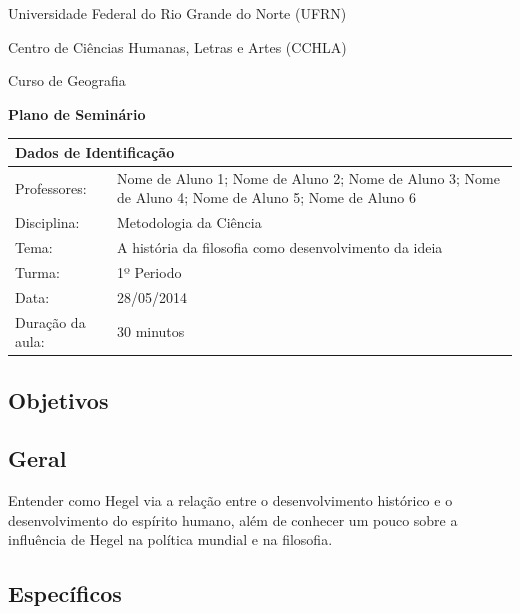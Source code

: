 \documentclass[oneside,a4paper,12pt]{article}
\newcommand{\universidade}{Universidade Federal do Rio Grande do Norte (UFRN) \par Centro de Ciências Humanas, Letras e Artes (CCHLA)}
\newcommand{\curso}{Geografia}
\newcommand{\professores}{Nome de Aluno 1; Nome de Aluno 2; Nome de Aluno 3; Nome de Aluno 4; Nome de Aluno 5; Nome de Aluno 6}
\newcommand{\disciplina}{Metodologia da Ciência}
\newcommand{\tema}{A história da filosofia como desenvolvimento da ideia}
\newcommand{\turma}{1º Periodo}
\newcommand{\data}{28/05/2014}
\newcommand{\tempodeaula}{30 minutos}
\begin{document}
  \pagestyle{empty}

	\begin{center}
	
	  \universidade
       \par
	  Curso de \curso
	  \par
	  \vspace{10pt}
	  \LARGE \textbf{Plano de Seminário}

	\end{center}

  \vspace{10pt}

	\begin{tabular}{ |l|p{12cm}| }

	  \hline
	  \multicolumn{2}{|l|}{\textbf{Dados de Identificação}} \\
	  \hline
	  Professores:         &    \professores           \\
	  \hline
	  Disciplina:        &    \disciplina          \\
	  \hline
	  Tema:              &    \tema                \\
	  \hline
	  Turma:             &    \turma               \\
	  \hline
	  Data:              &    \data                \\
	  \hline
	  Duração da aula:   &    \tempodeaula         \\
	  \hline

	\end{tabular}

  \begin{snugshade}
  \section{Objetivos} %
  \end{snugshade}
  
    \subsection{Geral} %

	Entender como Hegel via a relação entre o desenvolvimento histórico e o desenvolvimento do espírito humano, além de conhecer um pouco sobre a influência de Hegel na política mundial e na filosofia.
    
    \subsection{Específicos} %
    
\end{document}
